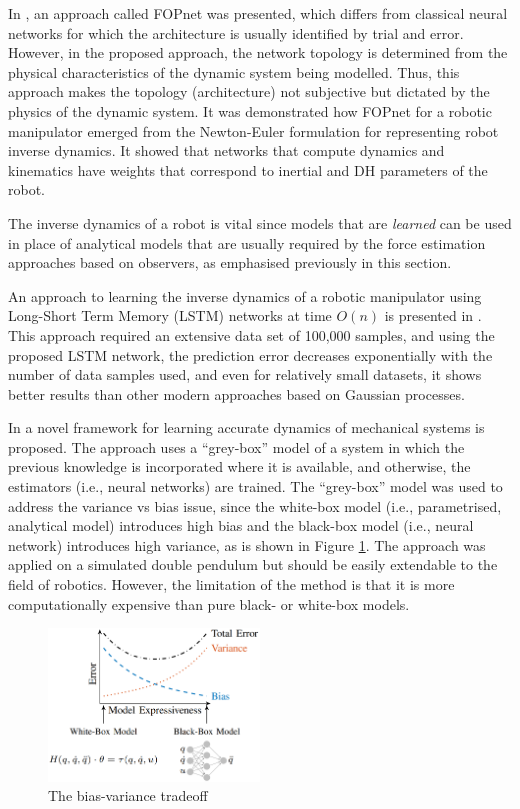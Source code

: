 In \cite{Ledezma2017}, an approach called FOPnet was presented, which differs from classical neural networks for which the architecture is usually identified by trial and error. However, in the proposed approach, the network topology is determined from the physical characteristics of the dynamic system being modelled. Thus, this approach makes the topology (architecture) not subjective but dictated by the physics of the dynamic system. It was demonstrated how FOPnet for a robotic manipulator emerged from the Newton-Euler formulation for representing robot inverse dynamics. It showed that networks that compute dynamics and kinematics have weights that correspond to inertial and DH parameters of the robot.

The inverse dynamics of a robot is vital since models that are \emph{learned} can be used in place of analytical models that are usually required by the force estimation approaches based on observers, as emphasised previously in this section. 

An approach to learning the inverse dynamics of a robotic manipulator using Long-Short Term Memory (LSTM) networks at time $O(n)$ is presented in \cite{Rueckert2017}. This approach required an extensive data set of 100,000 samples, and using the proposed LSTM network, the prediction error decreases exponentially with the number of data samples used, and even for relatively small datasets, it shows better results than other modern approaches based on Gaussian processes. 

In \cite{Gupta2019} a novel framework for learning accurate dynamics of mechanical systems is proposed. The approach uses a ``grey-box'' model of a system in which the previous knowledge is incorporated where it is available, and otherwise, the estimators (i.e., neural networks) are trained. The ``grey-box'' model was used to address the variance vs bias issue, since the white-box model (i.e., parametrised, analytical model) introduces high bias and the black-box model (i.e., neural network) introduces high variance, as is shown in Figure \ref{fig:StructuredLearning}. The approach was applied on a simulated double pendulum but should be easily extendable to the field of robotics. However, the limitation of the method is that it is more computationally expensive than pure black- or white-box models.

\begin{figure}
    \centering
    \includegraphics[width=0.5\textwidth]{slike/gupta2019.png}
    \caption[The bias-variance tradeoff]{The bias-variance tradeoff \cite{Gupta2019}}
    \label{fig:StructuredLearning}
\end{figure}

\newpage